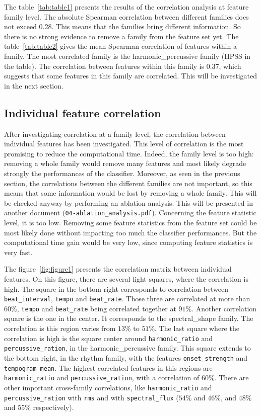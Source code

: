 \documentclass[11pt]{article}
\begin{document}
The table~\ref{tab:table1} presents the results of the correlation analysis at feature family level. The absolute Spearman correlation between different families does not exceed 0.28. This means that the families bring different information. So there is no strong evidence to remove a family from the feature set yet.
The table~\ref{tab:table2} gives the mean Spearman correlation of features within a family. The most correlated family is the harmonic\_percussive family (HPSS in the table). 
The correlation between features within this family  is 0.37, which suggests that some features in this family are correlated.  This will be investigated in the next section.


\subsection{Individual feature correlation}
After investigating correlation at a family level, the correlation between individual features has been investigated. This level of correlation is the most promising to reduce the computational time. Indeed, the family level is too high: removing a whole family would remove many features and most likely degrade strongly the performances of the classifier. Moreover, as seen in the previous section, the correlations between the different families are not important, so this means that some information would be lost by removing a whole family. This will be checked anyway by performing an ablation analysis. This will be presented in another document (\texttt{04-ablation\_analysis.pdf}).
Concerning the feature statistic level, it is too low. Removing some feature statistics from the feature set could be most likely done without impacting too much the classifier performances. But the computational time gain would be very low, since computing feature statistics is very fast.

The figure~\ref{fig:figure1} presents the correlation matrix between individual features. On this figure, there are several light squares, where the correlation is high. The square in the bottom right corresponds to correlation between \texttt{beat\_interval}, \texttt{tempo} and \texttt{beat\_rate}. Those three are correlated at more than $60 \%$,  \texttt{tempo} and \texttt{beat\_rate} being correlated together at $91 \%$. Another correlation square is the one in the center. It corresponds to the spectral\_shape family. The correlation is this region varies from $13\%$ to $51 \%$.
The last square where the correlation is high is the square center around \texttt{harmonic\_ratio} and \texttt{percussive\_ration}, in the harmonic\_percussive family. This square extends to the bottom right, in the rhythm family, with the features \texttt{onset\_strength} and \texttt{tempogram\_mean}. The highest correlated features in this regions are \texttt{harmonic\_ratio} and \texttt{percussive\_ration}, with a correlation of 
$60\%$.
There are other important cross-family correlations, like \texttt{harmonic\_ratio} and \texttt{percussive\_ration} with \texttt{rms} and with \texttt{spectral\_flux} ($54\%$ and $46\%$, and $48 \% $ and $55 \%$ respectively).
\end{document}
